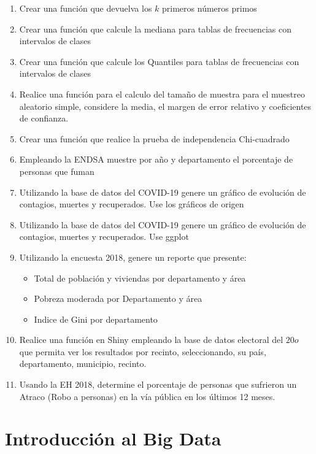 \documentclass[
]{book}
\providecommand{\tightlist}{%
  \setlength{\itemsep}{0pt}\setlength{\parskip}{0pt}}
\begin{document}
\begin{enumerate}
\def\labelenumi{\arabic{enumi}.}
\tightlist
\item
  Crear una función que devuelva los \(k\) primeros números primos
\item
  Crear una función que calcule la mediana para tablas de frecuencias con intervalos de clases
\item
  Crear una función que calcule los Quantiles para tablas de frecuencias con intervalos de clases
\item
  Realice una función para el calculo del tamaño de muestra para el muestreo aleatorio simple, considere la media, el margen de error relativo y coeficientes de confianza.
\item
  Crear una función que realice la prueba de independencia Chi-cuadrado
\item
  Empleando la ENDSA muestre por año y departamento el porcentaje de personas que fuman
\item
  Utilizando la base de datos del COVID-19 genere un gráfico de evolución de contagios, muertes y recuperados. Use los gráficos de origen
\item
  Utilizando la base de datos del COVID-19 genere un gráfico de evolución de contagios, muertes y recuperados. Use ggplot
\item
  Utilizando la encuesta 2018, genere un reporte que presente:

  \begin{itemize}
  \tightlist
  \item
    Total de población y viviendas por departamento y área
  \item
    Pobreza moderada por Departamento y área
  \item
    Indice de Gini por departamento
  \end{itemize}
\item
  Realice una función en Shiny empleando la base de datos electoral del \(20o\) que permita ver los resultados por recinto, seleccionando, su país, departamento, municipio, recinto.
\item
  Usando la EH 2018, determine el porcentaje de personas que sufrieron un Atraco (Robo a personas) en la vía pública en los últimos 12 meses.
\end{enumerate}

\hypertarget{introducciuxf3n-al-big-data}{%
\chapter{Introducción al Big Data}\label{introducciuxf3n-al-big-data}}
\end{document}
